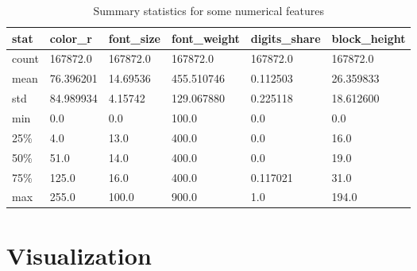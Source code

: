 \begin{table}
\begin{center}
{\renewcommand{\arraystretch}{1.5}
\begin{tabular}{| p{0.8cm} | p{2cm}|  p{2cm}|  p{2.3cm}|  p{2.3cm}|  p{2.4cm}|}
\hline
\textbf{stat}	&	\textbf{color\_r}	&	\textbf{font\_size}	&	\textbf{font\_weight}	&	\textbf{digits\_share}	&	\textbf{block\_height}\\
\hline
count	&	167872.0	&	167872.0	&	167872.0	&	167872.0	&	167872.0\\
\hline
mean	&	76.396201	&	14.69536	&	455.510746	&	0.112503	&	26.359833\\
\hline
std	&	84.989934	&	4.15742	&	129.067880	&	0.225118	&	18.612600\\
\hline
min	&	0.0	&	0.0	&	100.0	&	0.0	&	0.0\\
\hline
25\%	&	4.0	&	13.0	&	400.0	&	0.0	&	16.0\\
\hline
50\%	&	51.0	&	14.0	&	400.0	&	0.0	&	19.0\\
\hline
75\%	&	125.0	&	16.0	&	400.0	&	0.117021	&	31.0\\
\hline
max	&	255.0	&	100.0	&	900.0	&	1.0	&	194.0\\
\hline
\end{tabular}}
\caption{Summary statistics for some numerical features}
\label{table:sumstatnum}
\end{center}
\end{table}	
















\section{Visualization}



